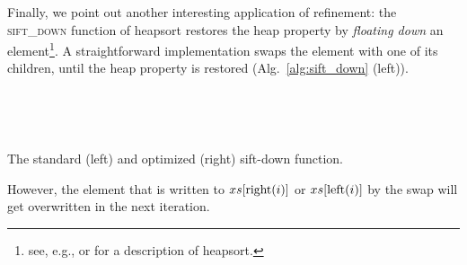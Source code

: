 \documentclass[runningheads]{llncs}
\begin{document}
  Finally, we point out another interesting application of refinement: the \textsc{sift\_down} function of heapsort
  restores the heap property by \emph{floating down} an element\footnote{see, e.g., \cite[Ch.~6]{CLRS09} or \cite[Ch.~2.4]{SeWa11} for a description of heapsort.}.
  A straightforward implementation swaps the element with one of its children, until the heap property is restored (Alg.~\ref{alg:sift_down} (left)).
  \begin{algorithm}
    \begin{minipage}[t]{.49\textwidth}
    \begin{algorithmic}
      \State{}
          \Else~\Return{}
          \EndIf
        \Else~\Return{}
        \EndIf
      \EndWhile
      \EndIf
    \EndProcedure
    \end{algorithmic}
    \end{minipage}
    \hfill
    \begin{minipage}[t]{.49\textwidth}
    \begin{algorithmic}
          \Else~\Return{}
          \EndIf
        \Else~\Return{}
        \EndIf
      \EndWhile
      \EndIf
    \EndProcedure
    \end{algorithmic}
    \end{minipage}
    \caption{The standard (left) and optimized (right) sift-down function.}\label{alg:sift_down}
  \end{algorithm}
  However, the element that is written to $xs[\textrm{right}(i)]$ or $xs[\textrm{left}(i)]$ by the swap will get overwritten in the next iteration.
\end{document}
